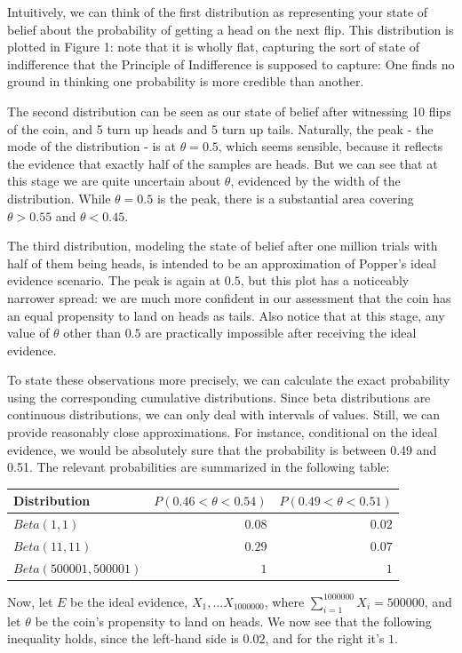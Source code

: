 Intuitively, we can think of the first distribution as representing your
state of belief about the probability of getting a head on the next
flip. This distribution is plotted in Figure 1: note that it is wholly
flat, capturing the sort of state of indifference that the Principle of
Indifference is supposed to capture: One finds no ground in thinking one
probability is more credible than another.

The second distribution can be seen as our state of belief after
witnessing 10 flips of the coin, and 5 turn up heads and 5 turn up tails.
Naturally, the peak - the mode of the distribution - is at
\(\theta = 0.5\), which seems sensible, because it reflects the evidence
that exactly half of the samples are heads. But we can see that at this
stage we are quite uncertain about \(\theta\), evidenced by the width of
the distribution. While \(\theta = 0.5\) is the peak, there is a
substantial area covering \(\theta > 0.55\) and \(\theta < 0.45\).

The third distribution, modeling the state of belief after one million
trials with half of them being heads, is intended to be an approximation
of Popper's ideal evidence scenario. The peak is again at \(0.5\), but
this plot has a noticeably narrower spread: we are much more confident
in our assessment that the coin has an equal propensity to land on heads
as tails. Also notice that at this stage, any value of \(\theta\) other
than \(0.5\) are practically impossible after receiving the ideal
evidence.

To state these observations more precisely, we can calculate the exact
probability using the corresponding cumulative distributions. Since beta
distributions are continuous distributions, we can only deal with
intervals of values. Still, we can provide reasonably close
approximations. For instance, conditional on the ideal evidence, we
would be absolutely sure that the probability is between 0.49 and 0.51. The relevant probabilities are summarized in the
following table:

\begin{longtable}[]{@{}lrr@{}}
\toprule
Distribution & \(P(0.46<\theta<0.54)\) &
\(P(0.49<\theta<0.51)\)\tabularnewline
\midrule
\endhead
\(Beta(1,1)\) & \(0.08\) & \(0.02\)\tabularnewline
\(Beta(11,11)\) & \(0.29\) & \(0.07\)\tabularnewline
\(Beta(500001,500001)\) & \(1\) & \(1\)\tabularnewline
\bottomrule
\end{longtable}

Now, let \(E\) be the ideal evidence, \(X_1,…X_{1000000}\), where
\(\sum_{i=1}^{1000000}X_i = 500000\), and let \(\theta\) be the coin's
propensity to land on heads. We now see that the following inequality
holds, since the left-hand side is \(0.02\), and for the right it's
\(1\).

